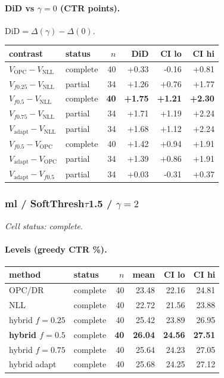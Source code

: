 \documentclass[10pt,a4paper]{article}
\begin{document}
\paragraph{DiD vs $\gamma=0$ (CTR points).} $\mathrm{DiD}=\Delta(\gamma)-\Delta(0)$.
{\centering\small\begin{tabular}{llrrrr}
\toprule contrast & status & $n$ & DiD & CI lo & CI hi \\
\midrule
$V_{\mathrm{OPC}}-V_{\mathrm{NLL}}$ & complete & 40 & +0.33 & -0.16 & +0.81 \\
$V_{f0.25}-V_{\mathrm{NLL}}$ & partial & 34 & +1.26 & +0.76 & +1.77 \\
\textbf{$V_{f0.5}-V_{\mathrm{NLL}}$} & complete & \textbf{40} & \textbf{+1.75} & \textbf{+1.21} & \textbf{+2.30} \\
$V_{f0.75}-V_{\mathrm{NLL}}$ & partial & 34 & +1.71 & +1.19 & +2.24 \\
$V_{\mathrm{adapt}}-V_{\mathrm{NLL}}$ & partial & 34 & +1.68 & +1.12 & +2.24 \\
$V_{f0.5}-V_{\mathrm{OPC}}$ & complete & 40 & +1.42 & +0.94 & +1.91 \\
$V_{\mathrm{adapt}}-V_{\mathrm{OPC}}$ & partial & 34 & +1.39 & +0.86 & +1.91 \\
$V_{\mathrm{adapt}}-V_{f0.5}$ & partial & 34 & +0.03 & -0.31 & +0.37 \\
\bottomrule\end{tabular}\par}
\bigskip
\subsubsection{ml / SoftThresh$\tau$1.5 / $\gamma=2$}
\emph{Cell status: complete}.
\paragraph{Levels (greedy CTR \%).}
{\centering\small\begin{tabular}{llrrrr}
\toprule method & status & $n$ & mean & CI lo & CI hi \\
\midrule
OPC/DR & complete & 40 & 23.48 & 22.16 & 24.81 \\
NLL & complete & 40 & 22.72 & 21.56 & 23.88 \\
hybrid $f{=}0.25$ & complete & 40 & 25.42 & 23.89 & 26.95 \\
\textbf{hybrid $f{=}0.5$} & complete & \textbf{40} & \textbf{26.04} & \textbf{24.56} & \textbf{27.51} \\
hybrid $f{=}0.75$ & complete & 40 & 25.64 & 24.23 & 27.05 \\
hybrid adapt & complete & 40 & 25.68 & 24.25 & 27.12 \\
\bottomrule\end{tabular}\par}
\end{document}
